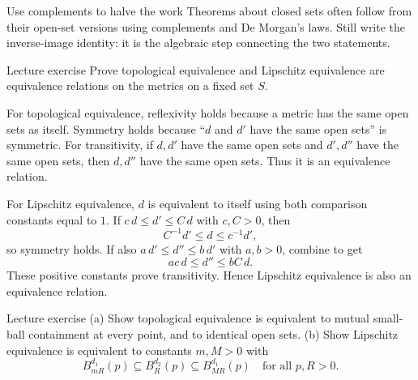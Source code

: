 \begin{method}{Use complements to halve the work}
Theorems about closed sets often follow from their open-set versions using complements and De Morgan's laws. Still write the inverse-image identity: it is the algebraic step connecting the two statements.
\end{method}
\begin{exam}{Lecture exercise}
Prove topological equivalence and Lipschitz equivalence are equivalence relations on the metrics on a fixed set $S$.
\end{exam}
\begin{answer}
For topological equivalence, reflexivity holds because a metric has the same open sets as itself. Symmetry holds because ``$d$ and $d'$ have the same open sets'' is symmetric. For transitivity, if $d,d'$ have the same open sets and $d',d''$ have the same open sets, then $d,d''$ have the same open sets. Thus it is an equivalence relation.

For Lipschitz equivalence, $d$ is equivalent to itself using both comparison constants equal to $1$. If $c\,d\le d'\le C\,d$ with $c,C>0$, then
\[C^{-1}d'\le d\le c^{-1}d',\]
so symmetry holds. If also $a\,d'\le d''\le b\,d'$ with $a,b>0$, combine to get
\[ac\,d\le d''\le bC\,d.\]
These positive constants prove transitivity. Hence Lipschitz equivalence is also an equivalence relation.
\end{answer}
\begin{exam}{Lecture exercise}
(a) Show topological equivalence is equivalent to mutual small-ball containment at every point, and to identical open sets. (b) Show Lipschitz equivalence is equivalent to constants $m,M>0$ with
\[B^{d_1}_{mR}(p)\subseteq B^{d_2}_R(p)\subseteq B^{d_1}_{MR}(p)\quad\text{for all }p,R>0.\]
\end{exam}
